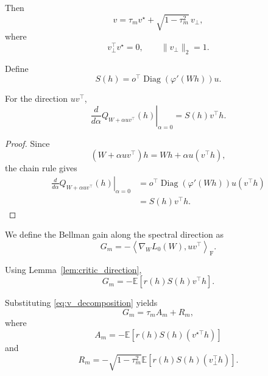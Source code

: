 Then
\begin{equation}
v
=
\tau_m v^\star
+
\sqrt{1-\tau_m^2}\,v_\perp,
\label{eq:v_decomposition}
\end{equation}
where
\begin{equation}
v_\perp^\top v^\star=0,
\qquad
\|v_\perp\|_2=1.
\end{equation}

Define
\begin{equation}
S(h)
=
o^\top
\operatorname{Diag}(\varphi'(Wh))u.
\label{eq:S_definition}
\end{equation}

\begin{lemma}
\label{lem:critic_direction}
For the direction $uv^\top$,
\begin{equation}
\left.
\frac{d}{d\alpha}
Q_{W+\alpha uv^\top}(h)
\right|_{\alpha=0}
=
S(h)v^\top h.
\end{equation}
\end{lemma}

\begin{proof}
Since
\begin{equation}
(W+\alpha uv^\top)h
=
Wh+\alpha u(v^\top h),
\end{equation}
the chain rule gives
\begin{align}
\left.
\frac{d}{d\alpha}
Q_{W+\alpha uv^\top}(h)
\right|_{\alpha=0}
&=
o^\top
\operatorname{Diag}(\varphi'(Wh))
u(v^\top h)
\\
&=
S(h)v^\top h.
\end{align}
\end{proof}

We define the Bellman gain along the spectral direction as
\begin{equation}
G_m
=
-
\left\langle
\nabla_WL_0(W),
uv^\top
\right\rangle_{\mathrm F}.
\label{eq:G_definition}
\end{equation}

Using Lemma~\ref{lem:critic_direction},
\begin{equation}
G_m
=
-
\mathbb{E}
\left[
r(h)S(h)v^\top h
\right].
\end{equation}

Substituting \eqref{eq:v_decomposition} yields
\begin{equation}
G_m
=
\tau_mA_m+R_m,
\label{eq:G_decomposition}
\end{equation}
where
\begin{equation}
A_m
=
-
\mathbb{E}
\left[
r(h)S(h)(v^{\star\top}h)
\right]
\label{eq:A_definition}
\end{equation}
and
\begin{equation}
R_m
=
-
\sqrt{1-\tau_m^2}
\mathbb{E}
\left[
r(h)S(h)(v_\perp^\top h)
\right].
\label{eq:R_definition}
\end{equation}

